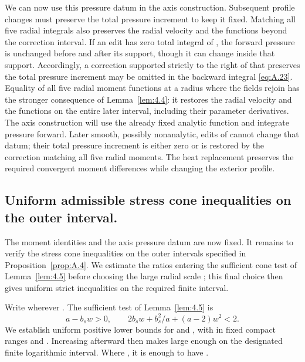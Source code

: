 We can now use this pressure datum in the axis construction. Subsequent profile changes must
preserve the total pressure increment to keep it fixed. Matching all five radial integrals also
preserves the radial velocity and the functions  beyond the
correction interval. If an edit has zero total integral of
, the forward pressure is
unchanged before and after its support, though it can change inside that support. Accordingly,
a correction supported strictly to the right of  that preserves the
total pressure increment may be omitted in the backward integral \eqref{eq:A.23}. Equality of
all five radial moment functions at a radius where the fields rejoin has the stronger consequence
of Lemma~\ref{lem:4.4}: it restores the radial velocity and the functions
 on the entire later interval, including their parameter
derivatives. The axis construction will use the already fixed analytic function
 and integrate pressure forward. Later smooth, possibly
nonanalytic, edits of  cannot change that datum; their total pressure
increment is either zero or is restored by the correction matching all five radial moments. The
heat replacement preserves the required convergent moment differences while changing the
exterior profile.

\subsection{Uniform admissible stress cone inequalities on the outer interval.}\label{sec:A.5}
The moment identities and the axis pressure datum are now fixed. It remains to verify the
stress cone inequalities on the outer intervals specified in Proposition~\ref{prop:A.4}. We
estimate the ratios entering the sufficient cone test of Lemma~\ref{lem:4.5} before choosing
the large radial scale ; this final choice then gives uniform strict
inequalities on the required finite interval.

Write  wherever
. The sufficient test of Lemma~\ref{lem:4.5} is
\begin{equation}
 a-b_sw>0,\qquad 2b_sw+b_s^2/a+(a-2)w^2<2.
 \tag{A.24}\label{eq:A.24}
\end{equation}
We establish uniform positive lower bounds for  and
, with
 in fixed compact ranges and
. Increasing  afterward then makes
 large enough on the designated finite logarithmic
interval. Where , it is enough to have
.

